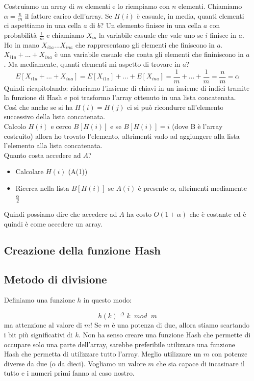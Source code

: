 \documentclass[a4paper]{article}
\begin{document}
Costruiamo un array di $m$ elementi e lo riempiamo con $n$ elementi.
Chiamiamo $\alpha = \frac{n}{m}$ il fattore carico dell'array. Se $H(i)$ è casuale,
in media, quanti elementi ci aspettiamo in una cella $a$ di $b$? Un elemento finisce in una cella $a$ con probabilità $\frac{1}{m}$ e chiamiamo $X_{ia}$ la variabile casuale 
che vale uno se $i$ finisce in $a$. Ho in mano $X_{i1a} ... X_{ina}$ che rappresentano gli elementi che finiscono in $a$.
$X_{i1a} + ... + X_{ina}$ è una variabile casuale che conta gli elementi che fininiscono in $a$. Ma mediamente, quanti elementi mi aspetto di trovare in $a$? 
\[E[X_{i1a} + ... + X_{ina}] = E[X_{i1a}] + ... + E[X_{ina}] = \frac{1}{m} + ... + \frac{1}{m} = \frac{n}{m} = \alpha \]
Quindi ricapitolando: riduciamo l'insieme di chiavi in un insieme di indici tramite la funzione di Hash e poi trasformo l'array ottenuto in una lista concatenata.
Così che anche se si ha $H(i) = H(j)$ ci si può ricondurre all'elemento successivo della lista concatenata.\\
Calcolo $H(i)$ e cerco $B[H(i)]$ e se $B[H(i)] = i$ (dove B è l'array costruito) allora ho trovato l'elemento, altrimenti vado ad aggiungere alla lista l'elemento alla lista concatenata.
\\
\vspace{1em}
\noindent
Quanto costa accedere ad $A$? 
\begin{itemize}
  \item Calcolare $H(i)$ (A(1))
  \item Ricerca nella lista $B[H(i)]$ se $A(i)$ è presente $\alpha$, altrimenti mediamente $\frac{\alpha}{2}$
\end{itemize}
Quindi possiamo dire che accedere ad $A$ ha costo $O(1+\alpha)$ che è costante ed è quindi è come accedere un array.

\subsection{Creazione della funzione Hash}

\subsection{Metodo di divisione}

Definiamo una funzione $h$ in questo modo:

\[h(k) \stackrel{\Delta}{=} k \; \; mod \; \;  m \] 
ma attenzione al valore di $m$! Se $m$ è una potenza di due, allora stiamo scartando
i bit più significativi di $k$. Non ha senso creare una funzione Hash che permette di occupare solo 
una parte dell'array, sarebbe preferibile utilizzare una funzione Hash che permetta di utilizzare tutto l'array.
Meglio utilizzare un $m$ con potenze diverse da due (o da dieci). Vogliamo un valore $m$ che sia capace di incasinare il tutto e i numeri primi fanno al caso nostro.
\end{document}
